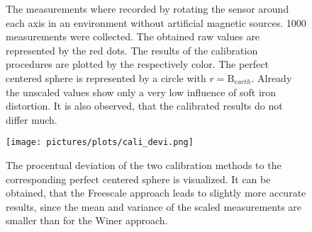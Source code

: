 \begin{figure}
\centering
	\hfill
\caption{The measurements where recorded by rotating the sensor around each axis in an environment without artificial magnetic sources. 1000 measurements were collected. The obtained raw values are represented by the red dots. The results of the calibration procedures are plotted by the respectively color. The perfect centered sphere is represented by a circle with $ r=\mathrm{B}_{earth} $. Already the unscaled values show only a very low influence of soft iron distortion. It is also observed, that the calibrated results do not differ much.}
\end{figure}

\begin{figure}
\centering
\texttt{[image: pictures/plots/cali\_devi.png]}
\caption{The procentual deviation of the two calibration methods to the corresponding perfect centered sphere is visualized. It can be obtained, that the Freescale approach leads to slightly more accurate results, since the mean and variance of the scaled measurements are smaller than for the Winer approach.}
\label{fig:devi}
\end{figure}



